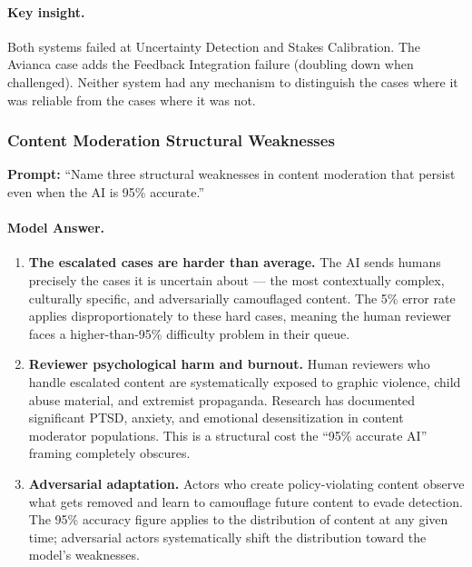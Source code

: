 \paragraph{Key insight.} Both systems failed at Uncertainty Detection and Stakes Calibration. The Avianca case adds the Feedback Integration failure (doubling down when challenged). Neither system had any mechanism to distinguish the cases where it was reliable from the cases where it was not.

\subsubsection{Content Moderation Structural Weaknesses}

\textbf{Prompt:} ``Name three structural weaknesses in content moderation that persist even when the AI is 95\% accurate.''

\paragraph{Model Answer.}

\begin{enumerate}
    \item \textbf{The escalated cases are harder than average.} The AI sends humans precisely the cases it is uncertain about --- the most contextually complex, culturally specific, and adversarially camouflaged content. The 5\% error rate applies disproportionately to these hard cases, meaning the human reviewer faces a higher-than-95\% difficulty problem in their queue.

    \item \textbf{Reviewer psychological harm and burnout.} Human reviewers who handle escalated content are systematically exposed to graphic violence, child abuse material, and extremist propaganda. Research has documented significant PTSD, anxiety, and emotional desensitization in content moderator populations. This is a structural cost the ``95\% accurate AI'' framing completely obscures.

    \item \textbf{Adversarial adaptation.} Actors who create policy-violating content observe what gets removed and learn to camouflage future content to evade detection. The 95\% accuracy figure applies to the distribution of content at any given time; adversarial actors systematically shift the distribution toward the model's weaknesses.
\end{enumerate}

